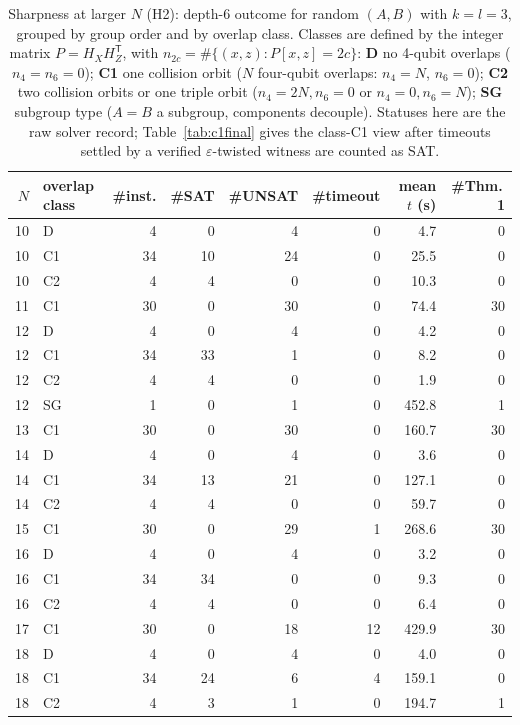 \begin{table}[tb]
\centering
\small
\caption{Sharpness at larger $N$ (H2): depth-6 outcome for random $(A,B)$ with $k=l=3$, grouped by group order and by overlap class. Classes are defined by the integer matrix $P = H_XH_Z^{\mathsf T}$, with $n_{2c} = \#\{(x,z): P[x,z]=2c\}$: \textbf{D} no 4-qubit overlaps ($n_4=n_6=0$); \textbf{C1} one collision orbit ($N$ four-qubit overlaps: $n_4=N$, $n_6=0$); \textbf{C2} two collision orbits or one triple orbit ($n_4=2N,n_6=0$ or $n_4=0,n_6=N$); \textbf{SG} subgroup type ($A=B$ a subgroup, components decouple). Statuses here are the raw solver record; Table~\ref{tab:c1final} gives the class-C1 view after timeouts settled by a verified $\varepsilon$-twisted witness are counted as SAT.}
\label{tabS:sharpness}
\begin{tabular}{rlrrrrrr}
\toprule
$N$ & overlap class & \#inst. & \#SAT & \#UNSAT & \#timeout & mean $t$ (s) & \#Thm.\,1 \\
\midrule
10 & D & 4 & 0 & 4 & 0 & 4.7 & 0 \\
10 & C1 & 34 & 10 & 24 & 0 & 25.5 & 0 \\
10 & C2 & 4 & 4 & 0 & 0 & 10.3 & 0 \\
11 & C1 & 30 & 0 & 30 & 0 & 74.4 & 30 \\
12 & D & 4 & 0 & 4 & 0 & 4.2 & 0 \\
12 & C1 & 34 & 33 & 1 & 0 & 8.2 & 0 \\
12 & C2 & 4 & 4 & 0 & 0 & 1.9 & 0 \\
12 & SG & 1 & 0 & 1 & 0 & 452.8 & 1 \\
13 & C1 & 30 & 0 & 30 & 0 & 160.7 & 30 \\
14 & D & 4 & 0 & 4 & 0 & 3.6 & 0 \\
14 & C1 & 34 & 13 & 21 & 0 & 127.1 & 0 \\
14 & C2 & 4 & 4 & 0 & 0 & 59.7 & 0 \\
15 & C1 & 30 & 0 & 29 & 1 & 268.6 & 30 \\
16 & D & 4 & 0 & 4 & 0 & 3.2 & 0 \\
16 & C1 & 34 & 34 & 0 & 0 & 9.3 & 0 \\
16 & C2 & 4 & 4 & 0 & 0 & 6.4 & 0 \\
17 & C1 & 30 & 0 & 18 & 12 & 429.9 & 30 \\
18 & D & 4 & 0 & 4 & 0 & 4.0 & 0 \\
18 & C1 & 34 & 24 & 6 & 4 & 159.1 & 0 \\
18 & C2 & 4 & 3 & 1 & 0 & 194.7 & 1 \\

\end{tabular}
\end{table}
